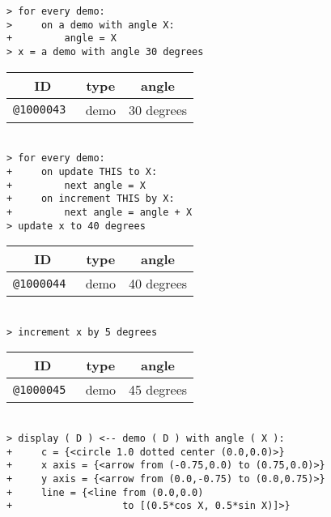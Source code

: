 \documentclass[12pt]{article}
\newenvironment{indpar}[1][0.3in]%
	{\begin{list}{}%
		     {\setlength{\itemsep}{0in}%
		      \setlength{\topsep}{0in}%
		      \setlength{\parsep}{1ex}%
		      \setlength{\labelwidth}{#1}%
		      \setlength{\leftmargin}{#1}%
		      \addtolength{\leftmargin}{\labelsep}}%
	 \item}%
	{\end{list}}
\begin{document}
\begin{indpar}
\verb|> for every demo:| \\
\verb|>     on a demo with angle X:| \\
\verb|+         angle = X| \\
\verb|> x = a demo with angle 30 degrees| \\
\begin{tabular}{|r|r|r|}
\hline
\multicolumn{1}{|c}{\bf ID} &
\multicolumn{1}{|c}{\bf type} &
\multicolumn{1}{|c|}{\bf angle} \\
\hline
\tt @1000043 & demo & 30 degrees \\
\hline
\end{tabular} \\[0.5ex]
\verb|> for every demo:| \\
\verb|+     on update THIS to X:|\\
\verb|+         next angle = X| \\
\verb|+     on increment THIS by X:| \\
\verb|+         next angle = angle + X| \\
\verb|> update x to 40 degrees| \\
\begin{tabular}{|r|r|r|}
\hline
\multicolumn{1}{|c}{\bf ID} &
\multicolumn{1}{|c}{\bf type} &
\multicolumn{1}{|c|}{\bf angle} \\
\hline
\tt @1000044 & demo & 40 degrees \\
\hline
\end{tabular} \\[0.5ex]
\verb|> increment x by 5 degrees| \\
\begin{tabular}{|r|r|r|}
\hline
\multicolumn{1}{|c}{\bf ID} &
\multicolumn{1}{|c}{\bf type} &
\multicolumn{1}{|c|}{\bf angle} \\
\hline
\tt @1000045 & demo & 45 degrees \\
\hline
\end{tabular} \\[0.5ex]
\verb/> display ( D ) <-- demo ( D ) with angle ( X ):/ \\
\verb/+     c = {<circle 1.0 dotted center (0.0,0.0)>}/ \\
\verb/+     x axis = {<arrow from (-0.75,0.0) to (0.75,0.0)>}/ \\
\verb/+     y axis = {<arrow from (0.0,-0.75) to (0.0,0.75)>}/ \\
\verb/+     line = {<line from (0.0,0.0)/ \\
\verb/+                   to [(0.5*cos X, 0.5*sin X)]>}/ \\

\end{indpar}
\end{document}
